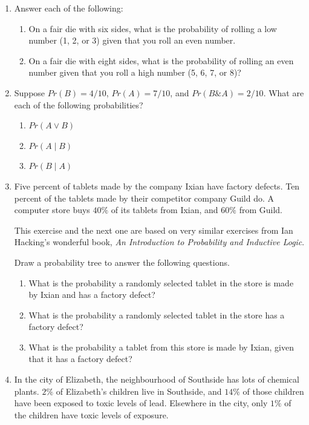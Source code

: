 \documentclass[justified]{tufte-book}
\providecommand{\tightlist}{%
  \setlength{\itemsep}{0pt}\setlength{\parskip}{0pt}}
\newcommand{\given}{\mid}
\renewcommand{\wedge}{\mathbin{\&}}
\newcommand{\p}{Pr}
\theoremstyle{definition}
\theoremstyle{definition}
\theoremstyle{definition}
\theoremstyle{remark}
\begin{document}
\begin{enumerate}
\item
  Answer each of the following:

  \begin{enumerate}
  \def\labelenumii{\alph{enumii}.}
  \tightlist
  \item
    On a fair die with six sides, what is the probability of rolling a
    low number (1, 2, or 3) given that you roll an even number.
  \item
    On a fair die with eight sides, what is the probability of rolling
    an even number given that you roll a high number (5, 6, 7, or 8)?
  \end{enumerate}
\item
  Suppose \(\p(B) = 4/10\), \(\p(A) = 7/10\), and
  \(\p(B \wedge A) = 2/10\). What are each of the following
  probabilities?

  \begin{enumerate}
  \def\labelenumii{\alph{enumii}.}
  \tightlist
  \item
    \(\p(A \vee B)\)
  \item
    \(\p(A \given B)\)
  \item
    \(\p(B \given A)\)
  \end{enumerate}
\item
  Five percent of tablets made by the company Ixian have factory
  defects. Ten percent of the tablets made by their competitor company
  Guild do. A computer store buys \(40\%\) of its tablets from Ixian,
  and \(60\%\) from Guild.

  \begin{marginfigure}
   This exercise and the next one are based on very similar exercises from
   Ian Hacking's wonderful book, \emph{An Introduction to Probability and
   Inductive Logic}.
   \end{marginfigure}

  Draw a probability tree to answer the following questions.

  \begin{enumerate}
  \def\labelenumii{\alph{enumii}.}
  \tightlist
  \item
    What is the probability a randomly selected tablet in the store is
    made by Ixian and has a factory defect?
  \item
    What is the probability a randomly selected tablet in the store has
    a factory defect?
  \item
    What is the probability a tablet from this store is made by Ixian,
    given that it has a factory defect?
  \end{enumerate}
\item
  In the city of Elizabeth, the neighbourhood of Southside has lots of
  chemical plants. \(2\%\) of Elizabeth's children live in Southside,
  and \(14\%\) of those children have been exposed to toxic levels of
  lead. Elsewhere in the city, only \(1\%\) of the children have toxic
  levels of exposure.


\end{enumerate}
\end{document}
